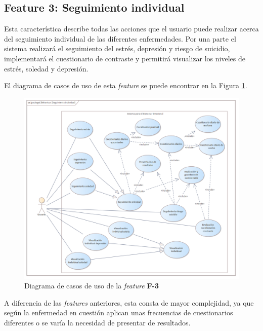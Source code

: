         \clearpage  %

        \subsection*{Feature 3: Seguimiento individual}

            Esta característica describe todas las acciones que el usuario puede realizar acerca del seguimiento individual de las diferentes enfermedades. Por una parte el sistema realizará el seguimiento del estrés, depresión y riesgo de suicidio, implementará el cuestionario de contraste y permitirá visualizar los niveles de estrés, soledad y depresión. 
            
            El diagrama de casos de uso de esta \textit{feature} se puede encontrar en la Figura \ref{figure:diagrama_casos_uso:f3}.

            \begin{figure}[h]
                \centering
                \includegraphics[width=1\textwidth]{figures/diseno/casos_uso/Seguimiento individual.png}
                \caption{Diagrama de casos de uso de la \textit{feature} \textbf{F-3}}
                \label{figure:diagrama_casos_uso:f3}
            \end{figure}

            A diferencia de las \textit{features} anteriores, esta consta de mayor complejidad, ya que según la enfermedad en cuestión aplican unas frecuencias de cuestionarios diferentes o se varía la necesidad de presentar de resultados.

